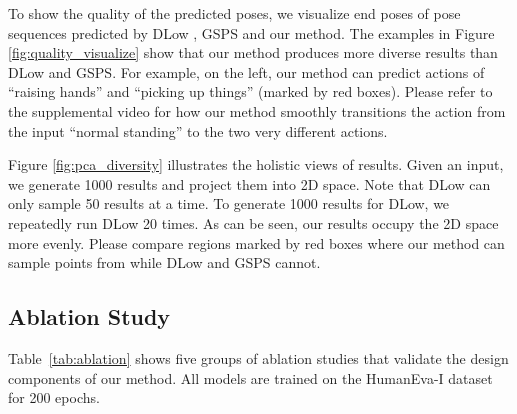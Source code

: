 \documentclass[sigconf,screen,nonacm]{acmart}
\begin{document}
	To show the quality of the predicted poses, we visualize end poses of pose sequences predicted by DLow \cite{yuan2020dlow}, GSPS \cite{mao2021generating} and our method. The examples in Figure \ref{fig:quality_visualize} show that our method produces more diverse results than DLow and GSPS. For example, on the left, our method can predict actions of ``raising hands'' and ``picking up things'' (marked by red boxes). Please refer to the supplemental video for how our method smoothly transitions the action from the input ``normal standing'' to the two very different actions.
	
	Figure \ref{fig:pca_diversity} illustrates the holistic views of results. Given an input, we generate 1000 results and project them into 2D space. Note that DLow can only sample 50 results at a time. To generate 1000 results for DLow, we repeatedly run DLow 20 times. 
As can be seen, our results occupy the 2D space more evenly. Please compare regions marked by red boxes where our method can sample points from while DLow and GSPS cannot.
	
	
	\subsection{Ablation Study}
	\label{sec:ablation}
	


	Table~\ref{tab:ablation} shows five groups of ablation studies that validate the design components of our method. All models are trained on the HumanEva-I dataset for 200 epochs.
	
\end{document}
